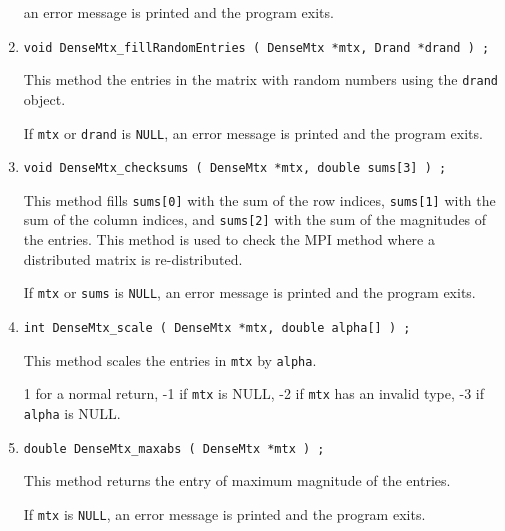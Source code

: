 \begin{enumerate}
an error message is printed and the program exits.
\item
\begin{verbatim}
void DenseMtx_fillRandomEntries ( DenseMtx *mtx, Drand *drand ) ;
\end{verbatim}
This method the entries in the matrix with random numbers using the
{\tt drand} object.
\par {}
If {\tt mtx} or {\tt drand} is {\tt NULL},
an error message is printed and the program exits.
\item
\begin{verbatim}
void DenseMtx_checksums ( DenseMtx *mtx, double sums[3] ) ;
\end{verbatim}
This method fills {\tt sums[0]} with the sum of the row indices,
{\tt sums[1]} with the sum of the column indices,
and
{\tt sums[2]} with the sum of the magnitudes of the entries.
This method is used to check the MPI method where a distributed
matrix is re-distributed.
\par {}
If {\tt mtx} or {\tt sums} is {\tt NULL},
an error message is printed and the program exits.
\item
\begin{verbatim}
int DenseMtx_scale ( DenseMtx *mtx, double alpha[] ) ;
\end{verbatim}
This method scales the entries in {\tt mtx} by {\tt alpha}.
\par {}
1 for a normal return,
-1 if {\tt mtx} is NULL,
-2 if {\tt mtx} has an invalid type,
-3 if {\tt alpha} is NULL.
\item
\begin{verbatim}
double DenseMtx_maxabs ( DenseMtx *mtx ) ;
\end{verbatim}
This method returns the entry of maximum magnitude of the entries.
\par {}
If {\tt mtx} is {\tt NULL},
an error message is printed and the program exits.

\end{enumerate}
